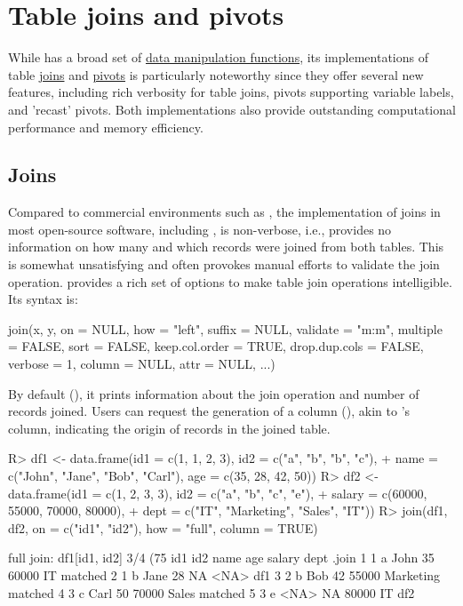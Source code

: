 \documentclass[article]{jss}
\begin{document}
\section{Table joins and pivots} \label{sec:join_pivot}
%
While  has a broad set of \href{https://sebkrantz.github.io/collapse/reference/fast-data-manipulation.html}{data manipulation functions}, its implementations of table \href{https://sebkrantz.github.io/collapse/reference/join.html}{joins} and \href{https://sebkrantz.github.io/collapse/reference/pivot.html}{pivots} is particularly noteworthy since they offer several new features, including rich verbosity for table joins, pivots supporting variable labels, and 'recast' pivots. Both implementations also provide outstanding computational performance and memory efficiency.
%
\subsection{Joins}
%
Compared to commercial environments such as , the implementation of joins in most open-source software, including , is non-verbose, i.e., provides no information on how many and which records were joined from both tables. This is somewhat unsatisfying and often provokes manual efforts to validate the join operation.  provides a rich set of options to make table join operations intelligible. Its syntax is:
\begin{Code}
join(x, y, on = NULL, how = "left", suffix = NULL, validate = "m:m",
  multiple = FALSE, sort = FALSE, keep.col.order = TRUE,
  drop.dup.cols = FALSE, verbose = 1, column = NULL, attr = NULL, ...)
\end{Code}
By default (), it prints information about the join operation and number of records joined. Users can request the generation of a  column (), akin to 's  column, indicating the origin of records in the joined table.
%
\begin{Schunk}
\begin{Sinput}
R> df1 <- data.frame(id1 = c(1, 1, 2, 3), id2 = c("a", "b", "b", "c"),
+    name = c("John", "Jane", "Bob", "Carl"), age = c(35, 28, 42, 50))
R> df2 <- data.frame(id1 = c(1, 2, 3, 3), id2 = c("a", "b", "c", "e"),
+    salary = c(60000, 55000, 70000, 80000),
+    dept = c("IT", "Marketing", "Sales", "IT"))
R> join(df1, df2, on = c("id1", "id2"), how = "full", column = TRUE)
\end{Sinput}
\begin{Soutput}
full join: df1[id1, id2] 3/4 (75%) <m:m> df2[id1, id2] 3/4 (75%)
  id1 id2 name age salary      dept   .join
1   1   a John  35  60000        IT matched
2   1   b Jane  28     NA      <NA>     df1
3   2   b  Bob  42  55000 Marketing matched
4   3   c Carl  50  70000     Sales matched
5   3   e <NA>  NA  80000        IT     df2
\end{Soutput}
\end{Schunk}
\end{document}
